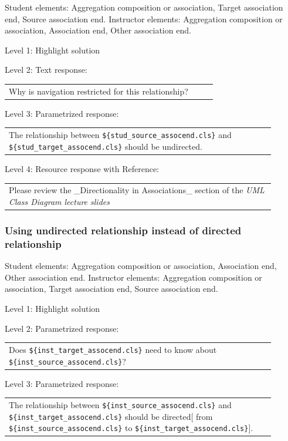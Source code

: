Student elements: Aggregation composition or association, Target association end, Source association end. Instructor elements: Aggregation composition or association, Association end, Other association end. \medskip

\noindent Level 1: Highlight solution  \medskip

\noindent Level 2: Text response: \medskip

\begin{tabular}{|p{0.9\linewidth}}
Why is navigation restricted for this relationship?
\end{tabular} \medskip

\noindent Level 3: Parametrized response: \medskip

\begin{tabular}{|p{0.9\linewidth}}
The relationship between \verb|${stud_source_assocend.cls}| and \verb|${stud_target_assocend.cls}| should be undirected.
\end{tabular} \medskip

\noindent Level 4: Resource response with Reference: \medskip

\begin{tabular}{|p{0.9\linewidth}}
Please review the _Directionality in Associations_ section of the \textit{UML Class Diagram lecture slides}
\end{tabular} \medskip


\subsubsection{Using undirected relationship instead of directed relationship}

Student elements: Aggregation composition or association, Association end, Other association end. Instructor elements: Aggregation composition or association, Target association end, Source association end. \medskip

\noindent Level 1: Highlight solution  \medskip

\noindent Level 2: Parametrized response: \medskip

\begin{tabular}{|p{0.9\linewidth}}
Does \verb|${inst_target_assocend.cls}| need to know about \verb|${inst_source_assocend.cls}|?
\end{tabular} \medskip

\noindent Level 3: Parametrized response: \medskip

\begin{tabular}{|p{0.9\linewidth}}
The relationship between \verb|${inst_source_assocend.cls}| and \verb|${inst_target_assocend.cls}| should be directed[ from \verb|${inst_source_assocend.cls}| to \verb|${inst_target_assocend.cls}|].
\end{tabular} \medskip

